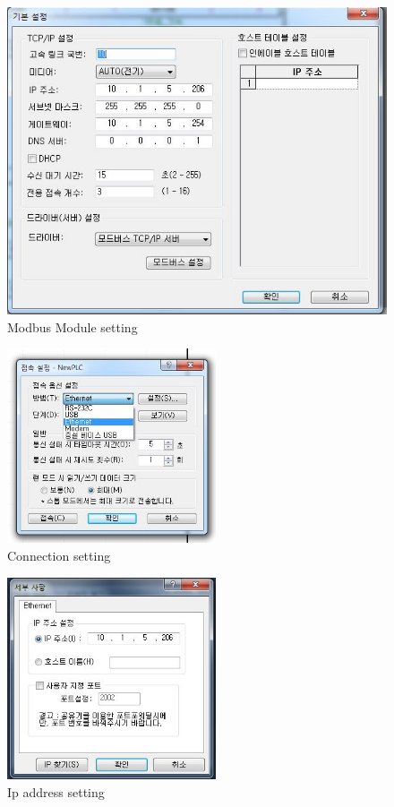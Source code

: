 \documentclass[11pt
  , a4paper
  , article
  , oneside
]{memoir}
\begin{document}
  
  \begin{figure}[h]
  	\centering
  	\includegraphics[width=0.55 \textwidth]{./picture/LS_modbus.JPG}
  	\caption{
  		Modbus Module setting
  	}
  	\label{fig:}
  \end{figure}
  
  \begin{figure}[h]
  	\centering
  	\includegraphics[width=0.55\textwidth]{./picture/ether-net.JPG}
  	\caption{
  		Connection setting
  	}
  	\label{fig:}
  \end{figure}
  
  
   \begin{figure}[h]
   	\centering
   	\includegraphics[width=0.55\textwidth]{./picture/LS_join_setting.JPG}
   	\caption{
   		Ip address setting 
   	}
   	\label{fig:}
  \end{figure}
  
\end{document}
